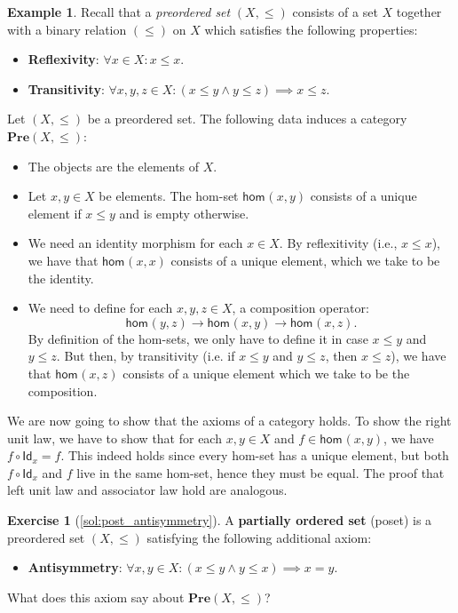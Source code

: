 \documentclass[a4paper,10pt]{scrartcl}
\theoremstyle{plain}
\theoremstyle{definition}
\newtheorem{exa}[thm]{Example}
\newtheorem{exer}[thm]{Exercise}
\newcommand{\cfont}[1]{\ensuremath{\mathsf{#1}}}
\newcommand{\Catb}[1]{\mathbf{#1}}
\newcommand{\PRE}{\Catb{Pre}}
\newcommand{\Hom}[3][]{\cfont{hom}_{#1}(#2,#3)}
\newcommand{\Id}[1][]{\cfont{Id}_{#1}}
\newcommand{\co}[2]{\ensuremath{#2 \circ #1}}
\begin{document}
\begin{exa}\label{example:posetcategories}
Recall that a \textit{preordered set} $(X,\leq)$ consists of a set $X$ together with a binary relation $(\leq)$ on $X$ which satisfies the following properties:
\begin{itemize}
\item \textbf{Reflexivity}: $\forall x\in X: x\leq x$.
\item \textbf{Transitivity}: $\forall x,y,z\in X: \left(x\leq y \wedge y\leq z\right) \implies x\leq z$.
\end{itemize}

  Let $(X,\leq)$ be a preordered set. The following data induces a category $\PRE(X,\leq)$:
\begin{itemize}
\item The objects are the elements of $X$.
\item Let $x,y \in X$ be elements. The hom-set $\Hom x y$ consists of a unique element if $x\leq y$ and is empty otherwise.
\item  We need an identity morphism for each $x\in X$.
  By reflexitivity (i.e., $x\leq x$), we have that $\Hom x x$ consists of a unique element, which we take to be the identity.
\item We need to define for each $x,y,z\in X$, a composition operator:
\[
\Hom y z \to \Hom x y \to \Hom x z.
\]
By definition of the hom-sets, we only have to define it in case $x\leq y$ and $y\leq z$.
But then, by transitivity (i.e. if $x\leq y$ and $y\leq z$, then $x\leq z$), we have that $\Hom x z$ consists of a unique element which we take to be the composition.
\end{itemize}
%
We are now going to show that the axioms of a category holds.
To show the right unit law, we have to show that for each $x,y\in X$ and $f\in \Hom x y$, we have $\co{\Id[x]}{f} = f$.
This indeed holds since every hom-set has a unique element, but both $\co{\Id[x]}{f}$ and $f$ live in the same hom-set, hence they must be equal.
The proof that left unit law and associator law hold are analogous.
\end{exa}

\begin{exer}[\cref{sol:post_antisymmetry}]\label{exer:post_antisymmetry}
  A \textbf{partially ordered set} (poset) is a preordered set $(X,\leq)$ satisfying the following additional axiom:
  \begin{itemize}
  \item \textbf{Antisymmetry}: $\forall x,y\in X: (x\leq y \wedge y\leq x) \implies x=y$.
  \end{itemize}
  What does this axiom say about $\PRE(X,\leq)$?
\end{exer}
\end{document}
